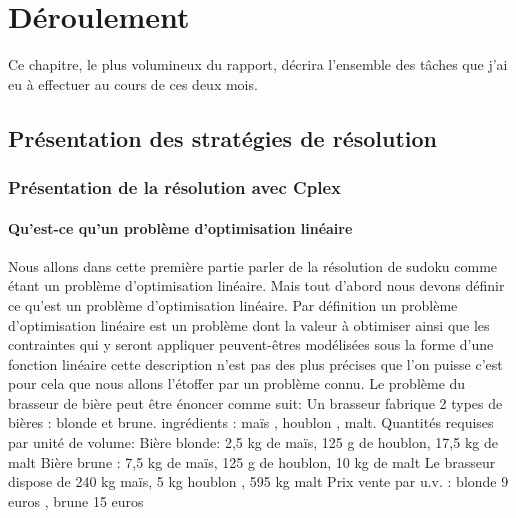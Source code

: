 \hypertarget{Déroulement}{%
\chapter{Déroulement}\label{Déroulement}}

Ce chapitre, le plus volumineux du rapport, décrira l'ensemble des tâches que j'ai eu à effectuer au cours de ces deux mois.


\section{Présentation des stratégies de résolution}
\subsection{Présentation de la résolution avec Cplex}
\subsubsection{Qu'est-ce qu'un problème d'optimisation linéaire}
Nous allons dans cette première partie parler de la résolution de sudoku comme étant un problème d'optimisation linéaire. Mais tout d'abord nous devons définir ce qu'est un problème d'optimisation linéaire.\newline\newline
Par définition un problème d'optimisation linéaire est un problème dont la valeur à obtimiser ainsi que les contraintes qui y seront appliquer peuvent-êtres modélisées sous la forme d'une fonction linéaire cette description n'est pas des plus précises que l'on puisse c'est pour cela que nous allons l'étoffer par un problème connu.\newline\newline
Le problème du brasseur de bière peut être énoncer comme suit:\newline\newline
Un brasseur fabrique 2 types de bières : blonde et brune. ingrédients : maïs , houblon , malt.\newline
Quantités requises par unité de volume:\newline
Bière blonde: 2,5 kg de maïs, 125 g de houblon, 17,5 kg de malt\newline
Bière brune : 7,5 kg de maïs, 125 g de houblon, 10 kg de malt\newline
Le brasseur dispose de 240 kg maïs, 5 kg houblon , 595 kg malt\newline
Prix vente par u.v. : blonde 9 euros , brune 15 euros
